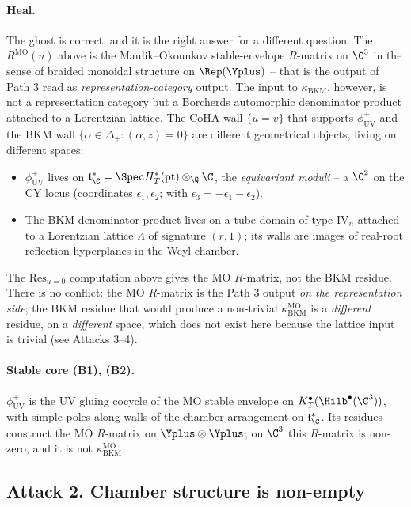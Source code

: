 \paragraph{Heal.} The ghost is correct, and it is the right
answer for a different question. The $R^{\mathrm{MO}}(u)$ above is
the Maulik--Okounkov stable-envelope $R$-matrix on $\C^3$ in the
sense of braided monoidal structure on $\Rep(\Yplus)$ -- that is the
output of Path 3 read as \emph{representation-category} output. The
input to $\kappa_{\mathrm{BKM}}$, however, is not a representation
category but a Borcherds automorphic denominator product attached to
a Lorentzian lattice. The CoHA wall $\{u = v\}$ that supports
$\phi^+_{\mathrm{UV}}$ and the BKM wall $\{\alpha \in \Delta_+ :
(\alpha, z) = 0\}$ are different geometrical objects, living on
different spaces:
\begin{itemize}
 \item $\phi^+_{\mathrm{UV}}$ lives on
 $\mathfrak t^*_\C = \Spec H^*_T(\mathrm{pt}) \otimes_\Q \C$, the
 \emph{equivariant moduli} -- a $\C^2$ on the CY locus (coordinates
 $\epsilon_1, \epsilon_2$; with $\epsilon_3 = -\epsilon_1 -
 \epsilon_2$).
 \item The BKM denominator product lives on a tube domain of type
 $\mathrm{IV}_n$ attached to a Lorentzian lattice $\Lambda$ of
 signature $(r, 1)$; its walls are images of real-root reflection
 hyperplanes in the Weyl chamber.
\end{itemize}
The $\mathrm{Res}_{u = 0}$ computation above gives the MO $R$-matrix,
not the BKM residue. There is no conflict: the MO $R$-matrix is the
Path 3 output \emph{on the representation side}; the BKM residue
that would produce a non-trivial $\kappa_{\mathrm{BKM}}^{\mathrm{MO}}$
is a \emph{different} residue, on a \emph{different} space, which
does not exist here because the lattice input is trivial (see
Attacks 3--4).

\paragraph{Stable core (B1), (B2).} $\phi^+_{\mathrm{UV}}$ is the
UV gluing cocycle of the MO stable envelope on
$K^\bullet_T(\Hilb^\bullet(\C^3))$, with simple poles along walls
of the chamber arrangement on $\mathfrak t^*_\C$. Its residues
construct the MO $R$-matrix on $\Yplus \otimes \Yplus$; on $\C^3$
this $R$-matrix is non-zero, and it is not $\kappa_{\mathrm{BKM}}^{
\mathrm{MO}}$.

\subsection*{Attack 2.  Chamber structure is non-empty}

